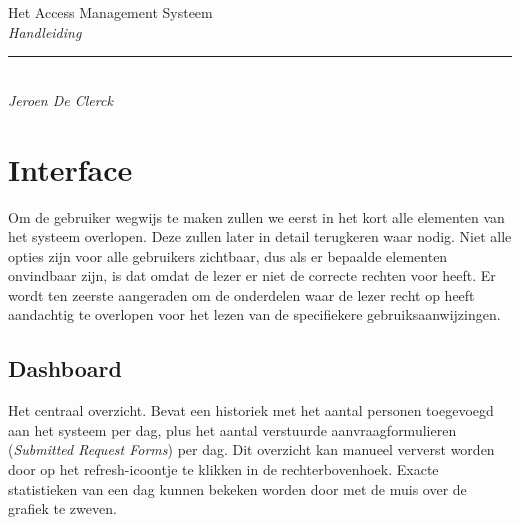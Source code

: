 \documentclass[]{memoir}
\begin{document}
\begingroup%
\centering
\vspace*{0.1\textheight}
{\Huge Het Access Management Systeem}\\[\baselineskip]
{\large\itshape Handleiding}\\[\baselineskip]
\vfill
\rule{0.4\textwidth}{0.4pt}\\[\baselineskip]
{\large\itshape Jeroen De Clerck}\par
\vspace*{0.1\textheight}
\endgroup
\thispagestyle{empty}

\clearpage
{}
\tableofcontents
\clearpage





\chapter{Interface} \label{Interface}
Om de gebruiker wegwijs te maken zullen we eerst in het kort alle elementen van het systeem overlopen. Deze zullen later in detail terugkeren waar nodig. Niet alle opties zijn voor alle gebruikers zichtbaar, dus als er bepaalde elementen onvindbaar zijn, is dat omdat de lezer er niet de correcte rechten voor heeft. Er wordt ten zeerste aangeraden om de onderdelen waar de lezer recht op heeft aandachtig te overlopen voor het lezen van de specifiekere gebruiksaanwijzingen.

\section{Dashboard} \label{Dashboard}
Het centraal overzicht. Bevat een historiek met het aantal personen toegevoegd aan het systeem per dag, plus het aantal verstuurde aanvraagformulieren (\textsl{Submitted Request Forms}) per dag. Dit overzicht kan manueel ververst worden door op het refresh-icoontje te klikken in de rechterbovenhoek. Exacte statistieken van een dag kunnen bekeken worden door met de muis over de grafiek te zweven.
\end{document}
